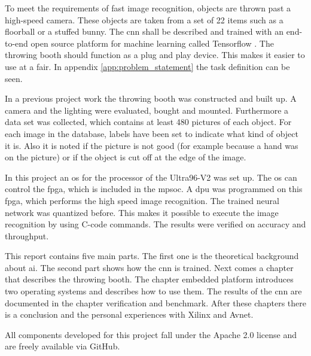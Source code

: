 To meet the requirements of fast image recognition, objects are thrown past a high-speed camera.
These objects are taken from a set of 22 items such as a floorball or a stuffed bunny.
The \acrshort{cnn} shall be described and trained with an end-to-end open source platform for machine learning called Tensorflow \cite{tensorflow_main}.
The throwing booth should function as a plug and play device.
This makes it easier to use at a fair.
In appendix \ref{app:problem_statement} the task definition can be seen.

In a previous project work the throwing booth was constructed and built up.
A camera and the lighting were evaluated, bought and mounted.
Furthermore a data set was collected, which contains at least 480 pictures of each object. 
For each image in the database, labels have been set to indicate what kind of object it is.
Also it is noted if the picture is not good (for example because a hand was on the picture) or if the object is cut off at the edge  of the image.

In this project an \acrfull{os} for the processor of the Ultra96-V2 was set up.
The \acrshort{os} can control the \acrfull{fpga}, which is included in the \acrfull{mpsoc}.
A \acrfull{dpu} was programmed on this \acrshort{fpga}, which performs the high speed image recognition.
The trained neural network was quantized before.
This makes it possible to execute the image recognition by using C-code commands.
The results were verified on accuracy and throughput.

This report contains five main parts.
The first one is the theoretical background about \acrfull{ai}.
The second part shows how the \acrlong{cnn} is trained.
Next comes a chapter that describes the throwing booth.
The chapter embedded platform introduces two operating systems and describes how to use them.
The results of the \acrshort{cnn} are documented in the chapter verification and benchmark.
After these chapters there is a conclusion and the personal experiences with Xilinx and Avnet.

All components developed for this project fall under the Apache 2.0 license and are freely available via GitHub.